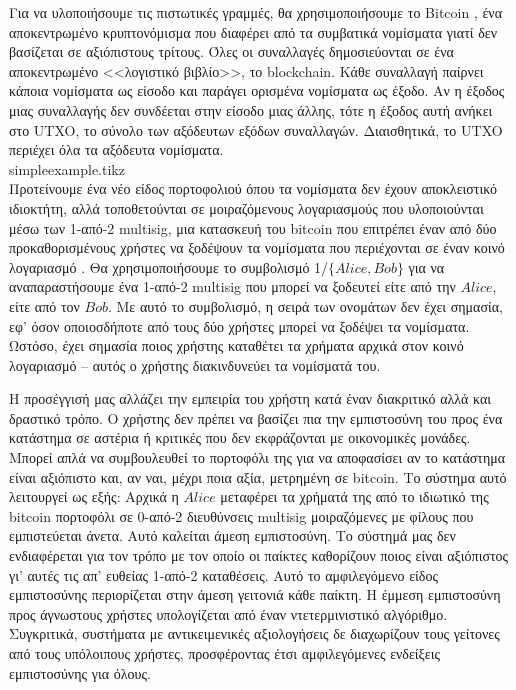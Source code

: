   Για να υλοποιήσουμε τις πιστωτικές γραμμές, θα χρησιμοποιήσουμε το \textlatin{Bitcoin} \cite{bitcoin}, ένα αποκεντρωμένο
  κρυπτονόμισμα που διαφέρει από τα συμβατικά νομίσματα γιατί δεν βασίζεται σε αξιόπιστους τρίτους. Όλες οι συναλλαγές
  δημοσιεύονται σε ένα αποκεντρωμένο <<λογιστικό βιβλίο>>, το \textlatin{block\-chain}. Κάθε συναλλαγή παίρνει κάποια
  νομίσματα ως είσοδο και παράγει ορισμένα νομίσματα ως έξοδο. Αν η έξοδος μιας συναλλαγής δεν συνδέεται στην είσοδο μιας
  άλλης, τότε η έξοδος αυτή ανήκει στο \textlatin{UTXO}, το σύνολο των αξόδευτων εξόδων συναλλαγών. Διαισθητικά, το
  \textlatin{UTXO} περιέχει όλα τα αξόδευτα νομίσματα.
  \medskip \ \\
  {simpleexample.tikz} \smallskip \ \\
  Προτείνουμε ένα νέο είδος πορτοφολιού όπου τα νομίσματα δεν έχουν αποκλειστικό ιδιοκτήτη, αλλά τοποθετούνται σε
  μοιραζόμενους λογαρια\-σμούς που υλοποιούνται μέσω των 1-από-2 \textlatin{multisig}, μια κατασκευή του \textlatin{bit\-coin}
  που επιτρέπει έναν από δύο προκαθορισμένους χρήστες να ξοδέψουν τα νομίσματα που περιέχονται σε έναν κοινό λογαριασμό
  \cite{masteringbitcoin}. Θα χρησιμοποιήσουμε το συμβολισμό 1/$\{Alice, Bob\}$ για να αναπαραστήσουμε ένα 1-από-2
  \textlatin{multisig} που μπορεί να ξοδευτεί είτε από την $Alice$, είτε από τον $Bob$. Με αυτό το συμβολισμό, η σειρά των
  ονομάτων δεν έχει σημασία, εφ' όσον οποιοσδήποτε από τους δύο χρήστες μπορεί να ξοδέψει τα νομίσματα. Ωστόσο, έχει σημασία
  ποιος χρήστης καταθέτει τα χρήματα αρχικά στον κοινό λογαριασμό -- αυτός ο χρήστης διακινδυνεύει τα νομίσματά του.

  Η προσέγγισή μας αλλάζει την εμπειρία του χρήστη κατά έναν διακριτικό αλλά και δραστικό τρόπο. Ο χρήστης δεν πρέπει να
  βασίζει πια την εμπιστοσύνη του προς ένα κατάστημα σε αστέρια ή κριτικές που δεν εκφράζονται με οικονομικές μονάδες. Μπορεί
  απλά να συμβουλευθεί το πορτοφόλι της για να αποφασίσει αν το κατάστημα είναι αξιόπιστο και, αν ναι, μέχρι ποια αξία,
  μετρημένη σε \textlatin{bitcoin}. Το σύστημα αυτό λειτουργεί ως εξής: Αρχικά η $Alice$ μεταφέρει τα χρήματά της από το
  ιδιωτικό της \textlatin{bitcoin} πορτοφόλι σε 0-από-2 διευθύνσεις \textlatin{multisig} μοιραζόμενες με φίλους που
  εμπιστεύεται άνετα. Αυτό καλείται άμεση εμπιστοσύνη. Το σύστημά μας δεν ενδιαφέρεται για τον τρόπο με τον οποίο οι παίκτες
  καθορίζουν ποιος είναι αξιόπιστος γι' αυτές τις απ' ευθείας 1-από-2 καταθέσεις. Αυτό το αμφιλεγόμενο είδος εμπιστοσύνης
  περιορίζεται στην άμεση γειτονιά κάθε παίκτη. Η έμμεση εμπιστοσύνη προς άγνωστους χρήστες υπολογίζεται από έναν
  ντετερμινιστικό αλγόριθμο. Συγκριτικά, συστήματα με αντικειμενικές αξιολογήσεις δε διαχωρίζουν τους γείτονες από τους
  υπόλοιπους χρήστες, προσφέροντας έτσι αμφιλεγόμενες ενδείξεις εμπιστοσύνης για όλους.

